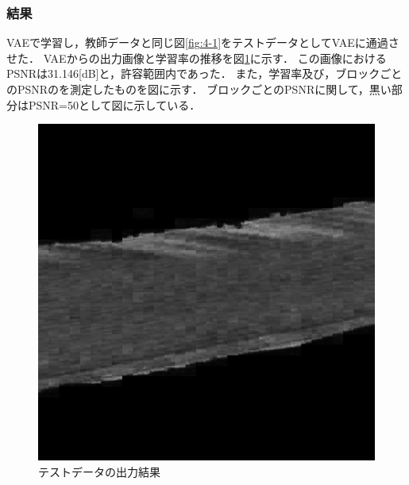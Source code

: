 \documentclass[twocolumn, a4j]{jsarticle}
\begin{document}
\subsubsection{結果}
VAEで学習し，教師データと同じ図\ref{fig:4-1}をテストデータとしてVAEに通過させた．
VAEからの出力画像と学習率の推移を図\ref{fig:4-2}に示す．
この画像におけるPSNRは31.146[dB]と，許容範囲内であった．
また，学習率及び，ブロックごとのPSNRのを測定したものを図に示す．
ブロックごとのPSNRに関して，黒い部分はPSNR=50として図に示している．
\begin{figure}[h]
  \begin{center}
    \includegraphics[width=0.9\columnwidth]{figure/output_test11.bmp}
  \end{center}
  \caption{テストデータの出力結果}
  \label{fig:4-2}
\end{figure}
\end{document}
